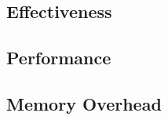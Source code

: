 \label{sec:eval}

\subsection{Effectiveness}

\subsection{Performance}

\subsection{Memory Overhead}
